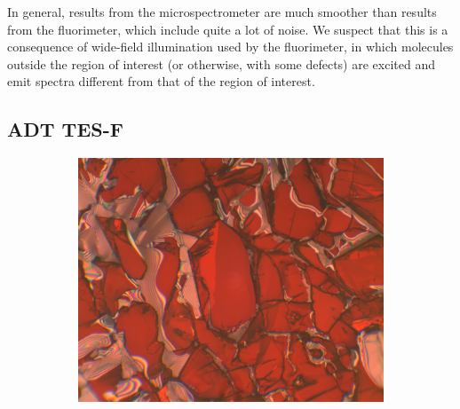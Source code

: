 In general, results from the microspectrometer are much smoother than results from the fluorimeter, which include quite a lot of noise. We suspect that this is a consequence of wide-field illumination used by the fluorimeter, in which molecules outside the region of interest (or otherwise, with some defects) are excited and emit spectra different from that of the region of interest. 

\subsection{ADT TES-F}

\begin{figure}[h]
    \centering
    \begin{subfigure}[b]{0.45\textwidth}
        \includegraphics[width=\textwidth]{./img/tesf-white-illum.png}
        \caption{}
        \label{img:tesf-white}
    \end{subfigure}
    \hfill
    \begin{subfigure}[b]{0.45\textwidth}

\end{subfigure}
\end{figure}
